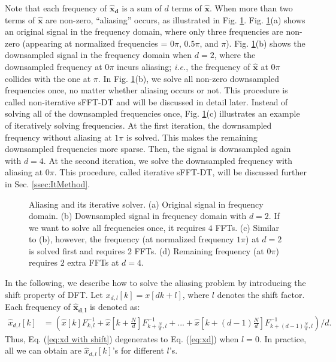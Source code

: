 \documentclass[journal,onecolumn,11pt]{IEEEtran}
\begin{document}
Note that each frequency of $\bm{\hat{x}_{d}}$ is a sum of $d$ terms of $\bm{\hat{x}}$.
When more than two terms of $\bm{\hat{x}}$ are non-zero, ``aliasing'' occurs, as illustrated in Fig. \ref{fig:Iterative Pyramid}.
Fig. \ref{fig:Iterative Pyramid}(a) shows an original signal in the frequency domain, where only three frequencies are non-zero (appearing at normalized frequencies = $0\pi$, $0.5\pi$, and $\pi$).
Fig. \ref{fig:Iterative Pyramid}(b) shows the downsampled signal in the frequency domain when $d=2$, where the downsampled frequency at $0\pi$ incurs aliasing; {\em i.e.}, the frequency of $\bm{\hat{x}}$ at $0\pi$ collides with the one at $\pi$.
In Fig. \ref{fig:Iterative Pyramid}(b), we solve all non-zero downsampled frequencies once, no matter whether aliasing occurs or not.
This procedure is called non-iterative sFFT-DT and will be discussed in detail later.
Instead of solving all of the downsampled frequencies once, Fig. \ref{fig:Iterative Pyramid}(c) illustrates an example of iteratively solving frequencies.
At the first iteration, the downsampled frequency without aliasing at $1\pi$ is solved.
This makes the remaining downsampled frequencies more sparse.
Then, the signal is downsampled again with $d=4$.
At the second iteration, we solve the downsampled frequency with aliasing at $0\pi$.
This procedure, called iterative sFFT-DT, will be discussed further in Sec. \ref{ssec:ItMethod}.


\begin{figure}[h]
\hfill
\caption{Aliasing and its iterative solver. (a) Original signal in frequency domain. (b) Downsampled signal in frequency domain with $d=2$. If we want to solve all frequencies once, it requires $4$ FFTs. (c) Similar to (b), however, the frequency (at normalized frequency $1\pi$) at $d=2$ is solved first and requires $2$ FFTs. (d) Remaining frequency (at $0\pi$) requires $2$ extra FFTs at $d=4$.}
\label{fig:Iterative Pyramid}
\end{figure}

In the following, we describe how to solve the aliasing problem by introducing the shift property of DFT.
Let $x_{d,l}[k]=x[dk+l]$, where $l$ denotes the shift factor.
Each frequency of $\bm{\hat{x}_{d,l}}$ is denoted as:
\small
\begin{equation}
\begin{aligned}
     \hat{x}_{d,l}[k]&=(\hat{x}[k]F_{k,l}^{-1}+\hat{x}[k+\frac{N}{d}]F_{k+\frac{N}{d},l}^{-1}+...+\hat{x}[k+(d-1)\frac{N}{d}]F_{k+(d-1)\frac{N}{d},l}^{-1})/d.
\end{aligned}
\label{eq:xd with shift}
\end{equation}
\normalsize
Thus, Eq. (\ref{eq:xd with shift}) degenerates to Eq. (\ref{eq:xd}) when $l=0$. In practice, all we can obtain are $ \hat{x}_{d,l}[k]$'s for different $l$'s.
\end{document}
